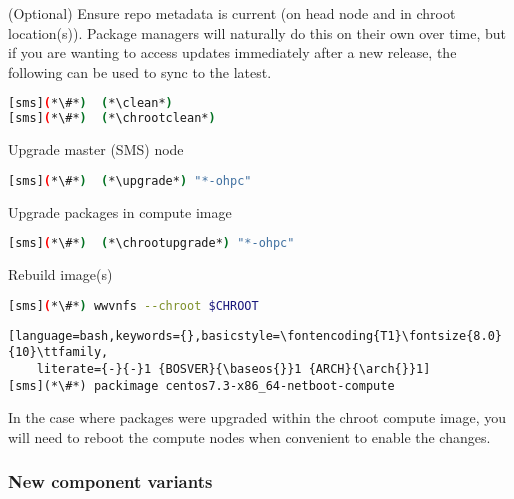 \begin{enumerate*}
\item (Optional) Ensure repo metadata is current (on head node and in chroot
  location(s)). Package managers will naturally do this on their own over time,
  but if you are wanting to access updates immediately after a new release,
  the following can be used to sync to the latest.

\begin{lstlisting}[language=bash,keywords={}]
[sms](*\#*)  (*\clean*)
[sms](*\#*)  (*\chrootclean*)
\end{lstlisting}

\item Upgrade master (SMS) node

\begin{lstlisting}[language=bash,keywords={}]
[sms](*\#*)  (*\upgrade*) "*-ohpc"
\end{lstlisting}
  
\item Upgrade packages in compute image

\begin{lstlisting}[language=bash,keywords={}]
[sms](*\#*)  (*\chrootupgrade*) "*-ohpc"
\end{lstlisting}
  
\item Rebuild image(s)

\begin{lstlisting}[language=bash,keywords={}]
[sms](*\#*) wwvnfs --chroot $CHROOT
\end{lstlisting}
\fi

\begin{lstlisting}[language=bash,keywords={},basicstyle=\fontencoding{T1}\fontsize{8.0}{10}\ttfamily,
    literate={-}{-}1 {BOSVER}{\baseos{}}1 {ARCH}{\arch{}}1]
[sms](*\#*) packimage centos7.3-x86_64-netboot-compute
\end{lstlisting}
\fi

\end{enumerate*}

\noindent In the case where packages were upgraded within the chroot compute image,
you will need to reboot the compute nodes when convenient to enable the
changes.

\subsubsection{New component variants}

